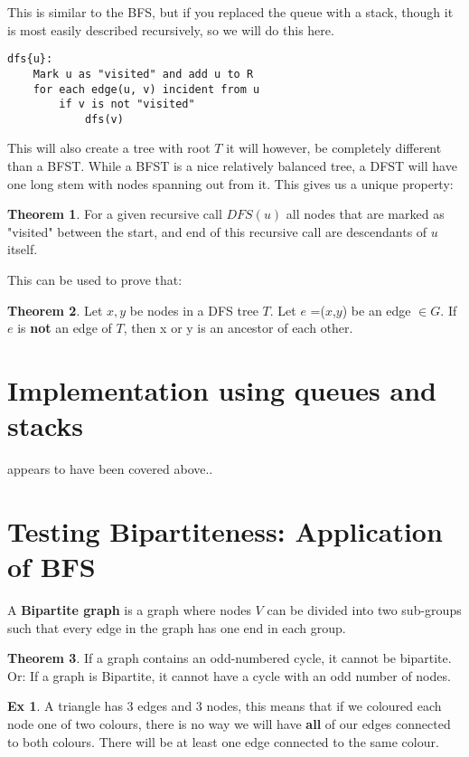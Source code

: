 \documentclass{report}
\theoremstyle{definition}
\newtheorem*{examp}{Ex}
\newtheorem*{theo}{Theorem}
\begin{document}
				 This is similar to the BFS, but if you replaced the queue with a stack, though it is most easily 
				described recursively, so we will do this here.
\begin{lstlisting}
dfs{u}:
	Mark u as "visited" and add u to R
	for each edge(u, v) incident from u
		if v is not "visited"
			dfs(v)
\end{lstlisting}
				This will also create a tree with root $T$ it will however, be completely different than a BFST. While a BFST
				is a nice relatively balanced tree, a DFST will have one long stem with nodes spanning out from it. This gives
				us a unique property:
				\begin{theo}
					For a given recursive call $DFS(u)$ all nodes that are marked as "visited" between the start, and end
					of this recursive call are descendants of $u$ itself.
				\end{theo}
				This can be used to prove that:
				\begin{theo}
					Let $x, y$ be nodes in a DFS tree $T$. Let $e$ =($x$,$y$) be an edge $\in G$. If $e$ is \textbf{not}
					an edge of $T$, then x or y is an ancestor of each other.
				\end{theo}
	\section{Implementation using queues and stacks}
		appears to have been covered above..
\newpage
	\section{Testing Bipartiteness: Application of BFS}
		A \textbf{Bipartite graph} is a graph where nodes $V$ can be divided into two sub-groups such that every edge in the
		graph has one end in each group.\\
		\begin{theo}
			If a graph contains an odd-numbered cycle, it cannot be bipartite. Or: If a graph is Bipartite, it cannot have a
			cycle with an odd number of nodes.
		\end{theo}
		\begin{examp}
			A triangle has 3 edges and 3 nodes, this means that if we coloured each node one of two colours, there is no way
			we will have \textbf{all} of our edges connected to both colours. There will be at least one edge connected to the 
			same colour.
		\end{examp}
\end{document}
